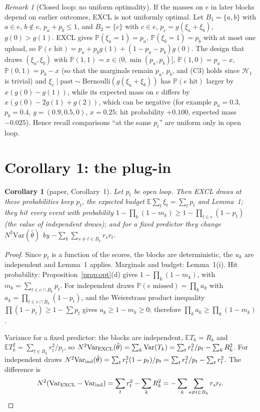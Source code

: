 \documentclass[11pt]{article}
\newtheorem{corollary}{Corollary}
\theoremstyle{remark}
\newtheorem{remark}{Remark}
\newcommand{\E}{\mathbb{E}}
\renewcommand{\Pr}{\mathbb{P}}
\newcommand{\Var}{\mathrm{Var}}
\newcommand{\Hk}{\mathcal H}
\newcommand{\hth}{\hat\theta}
\begin{document}
\begin{remark}[Closed loop: no uniform optimality]
If the masses on $e$ in later blocks depend on earlier outcomes, EXCL is not uniformly optimal. Let $B_1=\{a,b\}$ with $a\in e$, $b\notin e$, $p_a+p_b\le1$, and $B_2=\{c\}$ with $c\in e$, $p_c=g(\xi_a+\xi_b)$, $g(0)>g(1)$. EXCL gives $\Pr(\xi_a=1)=p_a$, $\Pr(\xi_b=1)=p_b$ with at most one upload, so $\Pr(e\text{ hit})=p_a+p_bg(1)+(1-p_a-p_b)g(0)$. The design that draws $(\xi_a,\xi_b)$ with $\Pr(1,1)=x\in(0,\min(p_a,p_b)]$, $\Pr(1,0)=p_a-x$, $\Pr(0,1)=p_b-x$ (so that the marginals remain $p_a$, $p_b$, and (C3) holds since $\Hk_1$ is trivial) and $\xi_c\mid\text{past}\sim\mathrm{Bernoulli}(g(\xi_a+\xi_b))$ has $\Pr(e\text{ hit})$ larger by $x(g(0)-g(1))$, while its expected mass on $e$ differs by $x(g(0)-2g(1)+g(2))$, which can be negative (for example $p_a=0.3$, $p_b=0.4$, $g=(0.9,0.5,0)$, $x=0.25$: hit probability $+0.100$, expected mass $-0.025$). Hence recall comparisons ``at the same $p_t$'' are uniform only in open loop.
\end{remark}

\section{Corollary 1: the plug-in}\label{sec:cor1}

\begin{corollary}[paper, Corollary~1]\label{cor:plugin}
Let $p_t$ be open loop. Then EXCL draws at these probabilities keep $p_t$, the expected budget $\E\sum_t\xi_t=\sum_tp_t$ and Lemma~1; they hit every event with probability $1-\prod_k(1-m_k)\ge1-\prod_{t\in e}(1-p_t)$ (the value of independent draws); and for a fixed predictor they change $N^2\Var(\hth)$ by $-\sum_k\sum_{s\ne t\in B_k}r_sr_t$.
\end{corollary}

\begin{proof}
Since $p_t$ is a function of the scores, the blocks are deterministic, the $u_k$ are independent and Lemma~1 applies. Marginals and budget: Lemma~1(i). Hit probability: Proposition~\ref{prop:opt}(d) gives $1-\prod_k(1-m_k)$, with $m_k=\sum_{t\in e\cap B_k}p_t$. For independent draws $\Pr(e\text{ missed})=\prod_k a_k$ with $a_k=\prod_{t\in e\cap B_k}(1-p_t)$, and the Weierstrass product inequality $\prod(1-p_t)\ge1-\sum p_t$ gives $a_k\ge1-m_k\ge0$; therefore $\prod_ka_k\ge\prod_k(1-m_k)$.

Variance for a fixed predictor: the blocks are independent, $\E T_k=R_k$ and $\E T_k^2=\sum_{t\in B_k}r_t^2/p_t$, so $N^2\Var_{\rm EXCL}(\hth)=\sum_k\Var(T_k)=\sum_t r_t^2/p_t-\sum_kR_k^2$. For independent draws $N^2\Var_{\rm ind}(\hth)=\sum_tr_t^2(1-p_t)/p_t=\sum_tr_t^2/p_t-\sum_tr_t^2$. The difference is
\[
N^2(\Var_{\rm EXCL}-\Var_{\rm ind})=\sum_tr_t^2-\sum_kR_k^2=-\sum_k\sum_{s\ne t\in B_k}r_sr_t .
\]
\end{proof}
\end{document}
